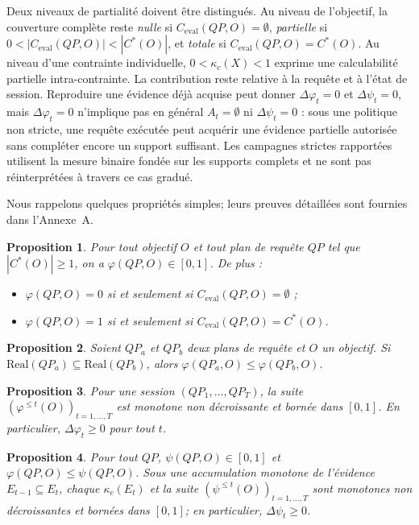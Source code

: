 \documentclass[journal]{IEEEtran}
\newtheorem{proposition}{Proposition}
\begin{document}
Deux niveaux de partialité doivent être distingués. Au niveau de l'objectif, la couverture complète reste \emph{nulle} si $C_{\mathrm{eval}}(QP,O)=\emptyset$, \emph{partielle} si $0<|C_{\mathrm{eval}}(QP,O)|<|C^*(O)|$, et \emph{totale} si $C_{\mathrm{eval}}(QP,O)=C^*(O)$. Au niveau d'une contrainte individuelle, $0<\kappa_c(X)<1$ exprime une calculabilité partielle intra-contrainte. La contribution reste relative à la requête et à l'état de session. Reproduire une évidence déjà acquise peut donner $\Delta\varphi_t=0$ et $\Delta\psi_t=0$, mais $\Delta\varphi_t=0$ n'implique pas en général $A_t=\emptyset$ ni $\Delta\psi_t=0$ : sous une politique non stricte, une requête exécutée peut acquérir une évidence partielle autorisée sans compléter encore un support suffisant. Les campagnes strictes rapportées utilisent la mesure binaire fondée sur les supports complets et ne sont pas réinterprétées à travers ce cas gradué.

Nous rappelons quelques propriétés simples; leurs preuves détaillées sont fournies dans l'Annexe~A.

\begin{proposition}
\label{prop:borne}
Pour tout objectif $O$ et tout plan de requête $QP$ tel que $|C^*(O)|\ge 1$, on a $\varphi(QP,O)\in[0,1]$. De plus :
\begin{itemize}
  \item $\varphi(QP,O)=0$ si et seulement si $C_{\mathrm{eval}}(QP,O)=\emptyset$ ;
  \item $\varphi(QP,O)=1$ si et seulement si $C_{\mathrm{eval}}(QP,O)=C^*(O)$.
\end{itemize}
\end{proposition}

\begin{proposition}
\label{prop:mono-real}
Soient $QP_a$ et $QP_b$ deux plans de requête et $O$ un objectif. Si $\mathrm{Real}(QP_a)\subseteq \mathrm{Real}(QP_b)$, alors $\varphi(QP_a,O)\le \varphi(QP_b,O)$.
\end{proposition}

\begin{proposition}
\label{prop:session}
Pour une session $(QP_1,\dots,QP_T)$, la suite $(\varphi^{\le t}(O))_{t=1,\dots,T}$ est monotone non décroissante et bornée dans $[0,1]$. En particulier, $\Delta\varphi_t\ge 0$ pour tout $t$.
\end{proposition}

\begin{proposition}
\label{prop:graded}
Pour tout $QP$, $\psi(QP,O)\in[0,1]$ et $\varphi(QP,O)\le\psi(QP,O)$. Sous une accumulation monotone de l'évidence $E_{t-1}\subseteq E_t$, chaque $\kappa_c(E_t)$ et la suite $(\psi^{\le t}(O))_{t=1,\dots,T}$ sont monotones non décroissantes et bornées dans $[0,1]$; en particulier, $\Delta\psi_t\ge 0$.
\end{proposition}
\end{document}
